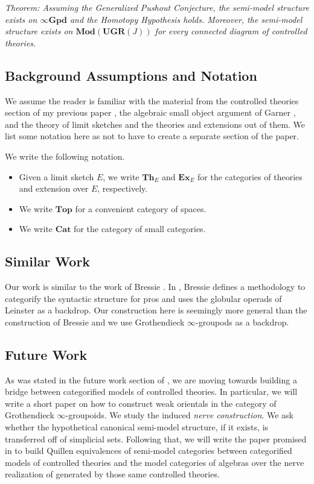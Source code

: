 \documentclass{tac}
\begin{document}
\emph{Theorem: Assuming the Generalized Pushout Conjecture, the semi-model structure exists on $\infty\mathbf{Gpd}$ and the Homotopy Hypothesis holds. Moreover, the semi-model structure exists on $\mathbf{Mod}(\mathbf{UGR}(J))$ for every connected diagram of controlled theories.}

\subsection*{Background Assumptions and Notation}
We assume the reader is familiar with the material from the controlled theories section of my previous paper \cite{Taylor2026Controlled}, the algebraic small object argument of Garner \cite{Garner2009}, and the theory of limit sketches and the theories and extensions out of them. We list some notation here as not to have to create a separate section of the paper.

\begin{notation}
We write the following notation.
\begin{itemize}
    \item Given a limit sketch $E$, we write $\mathbf{Th}_E$ and $\mathbf{Ex}_E$ for the categories of theories and extension over $E$, respectively.
    \item We write $\mathbf{Top}$ for a convenient category of spaces.
    \item We write $\mathbf{Cat}$ for the category of small categories.
\end{itemize}
\end{notation}

\subsection*{Similar Work} 
Our work is similar to the work of Bressie \cite{Bressie2020}. In \cite{Bressie2020}, Bressie defines a methodology to categorify the syntactic structure for pros and uses the globular operads of Leinster \cite{Lein} as a backdrop. Our construction here is seemingly more general than the construction of Bressie and we use Grothendieck $\infty$-groupods as a backdrop.

\subsection*{Future Work}
As was stated in the future work section of \cite{Taylor2026Controlled}, we are moving towards building a bridge between categorified models of controlled theories. In particular, we will write a short paper on how to construct weak orientals in the category of Grothendieck $\infty$-groupoids.
 We study the induced \emph{nerve construction}. We ask whether the hypothetical canonical semi-model structure, if it exists, is transferred off of simplicial sets.  Following that, we will write the paper promised in \cite{Taylor2026Controlled} to build Quillen equivalences of semi-model categories between categorified models of controlled theories and the model categories of algebras over the nerve realization of \cite{Taylor2026Controlled} generated by those same controlled theories. 
\end{document}
